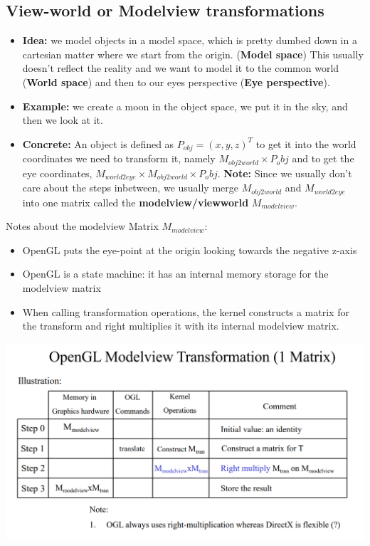 \documentclass[11pt]{article}
\begin{document}
\subsection{View-world or Modelview transformations}
\begin{itemize}
    \item \textbf{Idea:}  we model objects in a model space, which is pretty dumbed down in a cartesian matter where we start from the origin. (\textbf{Model space}) This usually doesn't reflect the reality and we want to model it to the common world (\textbf{World space}) and then to our eyes perspective (\textbf{Eye perspective}). 
    \item \textbf{Example:}  we create a moon in the object space, we put it in the sky, and then we look at it. 
    \item \textbf{Concrete:} An object is defined as $P_{obj} = (x,y,z)^T$ to get it into the world coordinates we need to transform it, namely $M_{obj2world} \times P_obj$ and to get the eye coordinates, $M_{world2eye}\times M_{obj2world} \times P_obj$.
    \textbf{Note:} Since we usually don't care about the steps inbetween, we usually merge $M_{obj2world}$ and $M_{world2eye}$ into one matrix called the \textbf{modelview/viewworld} $M_{modelview}$.
\end{itemize}


Notes about the modelview Matrix $M_{modelview}$:
\begin{itemize}
    \item OpenGL puts the eye-point at the origin looking towards the negative z-axis
    \item OpenGL is a state machine: it has an internal memory storage for the modelview matrix
    \item When calling transformation operations, the kernel constructs a matrix for the transform and right multiplies it with its internal modelview matrix.
\end{itemize} %

\includegraphics[scale=.5]{mv_steps.png}
 
\end{document}
